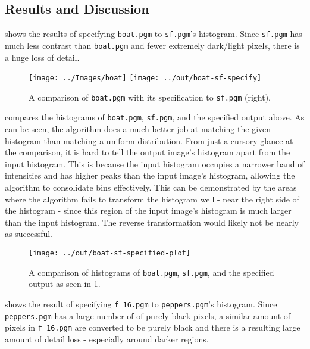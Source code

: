 \documentclass[headings=optiontoheadandtoc,listof=totoc,parskip=full]{scrartcl}
\begin{document}
\subsection{Results and Discussion}
\label{sec:specification-results}

 shows the results of specifying \texttt{boat.pgm} to \texttt{sf.pgm}'s histogram. Since \texttt{sf.pgm} has much less contrast than \texttt{boat.pgm} and fewer extremely dark/light pixels, there is a huge loss of detail.

\begin{figure}[H]
	\centering
	\texttt{[image: ../Images/boat]}
	\texttt{[image: ../out/boat-sf-specify]}
	\caption{A comparison of \texttt{boat.pgm} with its specification to \texttt{sf.pgm} (right).}
	\label{fig:specify-result-1}
\end{figure}

 compares the histograms of \texttt{boat.pgm}, \texttt{sf.pgm}, and the specified output above. As can be seen, the algorithm does a much better job at matching the given histogram than matching a uniform distribution. From just a cursory glance at the comparison, it is hard to tell the output image's histogram apart from the input histogram. This is because the input histogram occupies a narrower band of intensities and has higher peaks than the input image's histogram, allowing the algorithm to consolidate bins effectively. This can be demonstrated by the areas where the algorithm fails to transform the histogram well - near the right side of the histogram - since this region of the input image's histogram is much larger than the input histogram. The reverse transformation would likely not be nearly as successful.

\begin{figure}[H]
	\centering\texttt{[image: ../out/boat-sf-specified-plot]}
	\caption{A comparison of histograms of \texttt{boat.pgm}, \texttt{sf.pgm}, and the specified output as seen in \cref{fig:specify-result-1}.}
	\label{fig:specify-histogram-1}
\end{figure}

 shows the result of specifying \texttt{f\_16.pgm} to \texttt{peppers.pgm}'s histogram. Since \texttt{peppers.pgm} has a large number of of purely black pixels, a similar amount of pixels in \texttt{f\_16.pgm} are converted to be purely black and there is a resulting large amount of detail loss - especially around darker regions.
\end{document}
